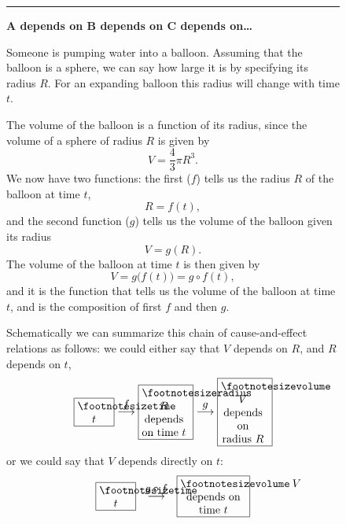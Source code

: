 \begin{figure}[t]




  \noindent\rule{\textwidth}{1pt}




  \begin{minipage}[b]{\textwidth}\sffamily\color{darkbluegreen}
    \setlength{\parindent}{1pc}
    \rule{0pt}{12pt}\centerline{\sffamily\bfseries%
      A depends on B depends on C depends on\ldots}
    \begin{multicols}{2}
      \noindent\small%
      Someone is pumping water into a balloon.  Assuming that the balloon is a
      sphere, we can say how large it is by specifying its radius $R$.  For an
      expanding balloon this radius will change with time $t$.




      The volume of the balloon is a function of its radius, since the
      volume of a sphere of radius $R$ is given by
      \[ V=\frac43\pi
      R^3.\]
      We now have two functions: the first ($f$) tells
      us the radius $R$ of the balloon at time $t$,
      \[
        R=f(t),
      \]
      and the second function ($g$) tells us the volume of the balloon given
      its radius
      \[
        V=g(R).
      \]
      The volume of the balloon at time $t$ is then given by
      \[
        V=g\bigl(f(t)\bigr) = g\circ f(t),
      \]
      and it is the function that tells us the volume of the balloon at time
      $t$, and is the composition of first $f$ and then $g$.




      Schematically we can summarize this chain of cause-and-effect relations as
      follows: we could either say that $V$ depends on $R$, and $R$ depends on
      $t$,
      \[
      \text{\framebox{\parbox{3em}{\centering\footnotesize%
              time $t$}}}
      \stackrel{\DS f}{\longrightarrow}
      \text{\framebox{\parbox{4em}{\centering\footnotesize%
      radius $R$\\
      depends on time $t$} }}
      \stackrel{\DS g}{\longrightarrow}
      \text{\framebox{\parbox{4em}{\centering\footnotesize%
      volume $V$\\ depends on radius $R$} }}
      \]
      or we could say that $V$ depends directly on $t$:
      \[
      \text{\framebox{\parbox{3em}{\centering\footnotesize%
              time $t$}}} \; \;
      \stackrel{\DS g\circ f}{\longrightarrow }\; \;
      \text{\framebox{\parbox{6em}{\centering\footnotesize%
      volume~$V$\\ depends on\\ time $t$}}}
      \]
    \end{multicols}





\end{minipage}
\end{figure}
